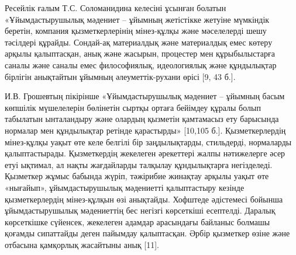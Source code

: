 \begin{multicols}{2}
Ресейлік ғалым Т.С. Соломанидина келесіні ұсынған болатын
«Ұйымдастырушылық мәдениет -- ұйымның жетістікке жетуіне мүмкіндік
беретін, компания қызметкерлерінің мінез-құлқы және мәселелерді шешу
тәсілдері құрайды. Сондай-ақ материалдық және материалдық емес көтеру
арқылы қалыптасқан, анық және жасырын, процестер мен құрыбылыстарға
саналы және саналы емес философиялық, идеологиялық және құндылықтар
бірлігін анықтайтын ұйымның әлеуметтік-рухани өрісі {[}9, 43 б.{]}.

И.В. Грошевтың пікірінше «Ұйымдастырушылық мәдениет -- ұйымның басым
көпшілік мүшелелерін бөлінетін сыртқы ортаға бейімдеу құралы болып
табылатын ынталандыру және олардың қызметін қамтамасыз ету барысында
нормалар мен құндылықтар ретінде қарастырды» {[}10,105 б.{]}.
Қызметкерлердің мінез-құлқы уақыт өте келе белгілі бір заңдылықтарды,
стильдерді, нормаларды қалыптастырады. Қызметкердің жекелеген әрекеттері
жалпы нәтижелерге әсер етуі ықтимал, ал нақты жағдайларды талқылау
құндылықтарға негізделеді. Қызметкер жұмыс бабында жүріп, тәжірибие
жинақтау арқылы уақыт өте «нығайып», ұйымдастырушылық мәдениетті
қалыптастыру кезінде қызметкерлердің мінез-құлқын өзі анықтайды.
Хофштеде әдістемесі бойынша ұйымдастырушылық мәдениеттің бес негізгі
көрсеткіші есептелді. Даралық көрсеткішке сүйенсек, жекелеген адамдар
арасындағы байланыс болмашы қоғамды сипаттайды деген пайымдау
қалыптасқан. Әрбір қызметкер өзіне және отбасына қамқорлық жасайтыны
анық {[}11{]}.


\end{multicols}
